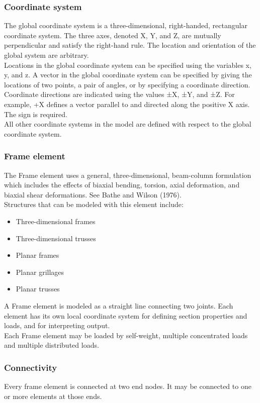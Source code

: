 \documentclass[12pt]{article}
\begin{document}
\subsubsection{Coordinate system}
The global coordinate system is a three-dimensional, right-handed, rectangular coordinate system. The three axes, denoted X, Y, and Z, are mutually perpendicular and satisfy the right-hand rule. The location and orientation of the global system are arbitrary.\\ Locations in the global coordinate system can be specified using the variables x, y, and z. A vector in the global coordinate system can be specified by giving the locations of two points, a pair of angles, or by specifying a coordinate direction. Coordinate directions are indicated using the values ±X, ±Y, and ±Z. For example, +X defines a vector parallel to and directed along the positive X axis. The sign is required. \\ All other coordinate systems in the model are defined with respect to the global coordinate system.

\subsubsection{Frame element}
The Frame element uses a general, three-dimensional, beam-column formulation which includes the effects of biaxial bending, torsion, axial deformation, and biaxial shear deformations. See Bathe and Wilson (1976).\\
Structures that can be modeled with this element include:
\begin{itemize}
    \item Three-dimensional frames
    \item Three-dimensional trusses
    \item Planar frames
    \item Planar grillages
    \item Planar trusses
\end{itemize}
A Frame element is modeled as a straight line connecting two joints. Each element has its own local coordinate system for defining section properties and loads, and for interpreting output.\\
Each Frame element may be loaded by self-weight, multiple concentrated loads and multiple distributed loads.

\subsubsection{Connectivity}
Every frame element is connected at two end nodes. It may be connected to one or more elements at those ends.
\end{document}
